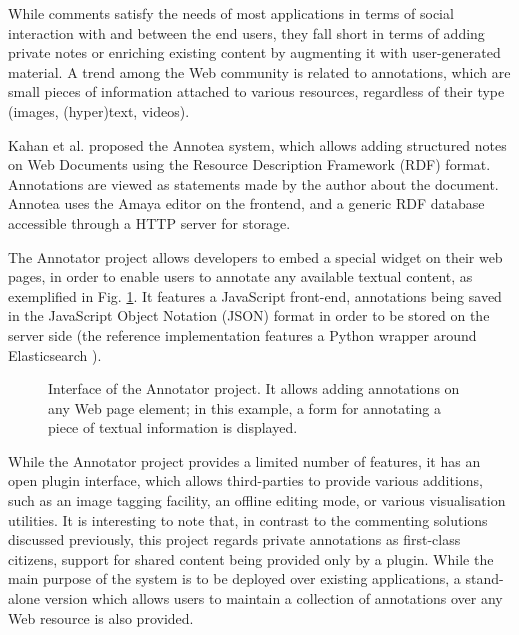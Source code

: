 While comments satisfy the needs of most applications in terms of social
interaction with and between the end users, they fall short in terms of adding
private notes or enriching existing content by augmenting it with
user-generated material. A trend among the Web community is related to
annotations, which are small pieces of information attached to various
resources, regardless of their type (images, (hyper)text, videos).

Kahan et al. \cite{ref:annotea} proposed the Annotea system, which allows
adding structured notes on Web Documents using the Resource Description
Framework (RDF) format. Annotations are viewed as statements made by the author
about the document. Annotea uses the Amaya \cite{ref:amaya} editor on the
frontend, and a generic RDF database accessible through a HTTP server for
storage.

The Annotator project \cite{ref:annotator} allows developers to embed a special
widget on their web pages, in order to enable users to annotate any available
textual content, as exemplified in Fig. \ref{fig:annotator}.  It features a
JavaScript front-end, annotations being saved in the JavaScript Object Notation
(JSON) format in order to be stored on the server side (the reference
implementation features a Python wrapper around Elasticsearch
\cite{ref:elasearch}).

\begin{figure}[p]
  \centering
  \caption[Interface of the Annotator project]
          {Interface of the Annotator project. It allows
           adding annotations on any Web page element; in this example, a form
           for annotating a piece of textual information is displayed.}
  \label{fig:annotator}
\end{figure}

While the Annotator project provides a limited number of features, it has an
open plugin interface, which allows third-parties to provide various additions,
such as an image tagging facility, an offline editing mode, or various
visualisation utilities. It is interesting to note that, in contrast to the
commenting solutions discussed previously, this project regards private
annotations as first-class citizens, support for shared content being provided
only by a plugin. While the main purpose of the system is to be deployed over
existing applications, a stand-alone version which allows users to maintain a
collection of annotations over any Web resource is also provided.

